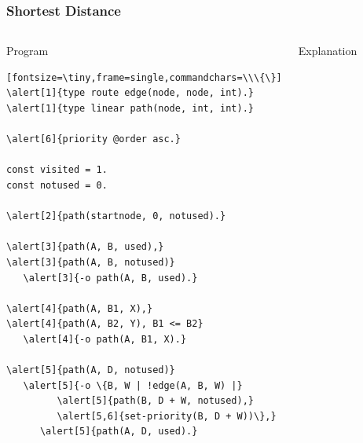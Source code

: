 \documentclass{beamer}
\let\oldalert\alert
\renewcommand{\alert}[2][]{%
  \if\relax\detokenize{#1}\relax%
    \oldalert{#2}%
  \else
    \oldalert<#1>{#2}%
  \fi}
\begin{document}
\begin{frame}[fragile]
   \frametitle{Shortest Distance}
   \begin{columns}[t]
       \begin{block}{Program}
         \begin{verbatim}[fontsize=\tiny,frame=single,commandchars=\\\{\}]
\alert[1]{type route edge(node, node, int).}
\alert[1]{type linear path(node, int, int).}

\alert[6]{priority @order asc.}

const visited = 1.
const notused = 0.

\alert[2]{path(startnode, 0, notused).}

\alert[3]{path(A, B, used),}
\alert[3]{path(A, B, notused)}
   \alert[3]{-o path(A, B, used).}

\alert[4]{path(A, B1, X),}
\alert[4]{path(A, B2, Y), B1 <= B2}
   \alert[4]{-o path(A, B1, X).}

\alert[5]{path(A, D, notused)}
   \alert[5]{-o \{B, W | !edge(A, B, W) |}
         \alert[5]{path(B, D + W, notused),}
         \alert[5,6]{set-priority(B, D + W))\},}
      \alert[5]{path(A, D, used).}
         \end{verbatim}
      \end{block}
      \begin{block}{Explanation}
         {\small
         \begin{itemize}
            
         \end{itemize}
         }
      \end{block}
   \end{columns}
\end{frame}
\end{document}
